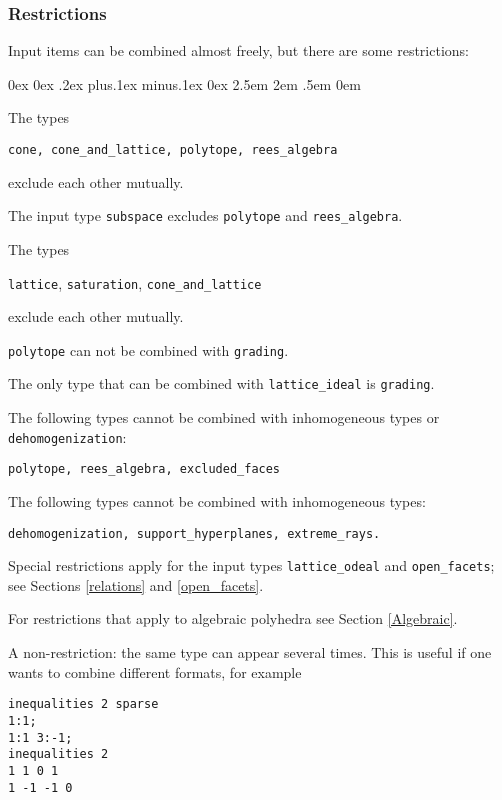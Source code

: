 \documentclass[12pt,a4paper]{scrartcl}
\newcounter{listi}
\newcommand{\stdli}{ \topsep0ex \partopsep0ex %
\parsep.2ex plus.1ex minus.1ex \itemsep0ex%
\leftmargin2.5em \labelwidth2em \labelsep.5em \rightmargin0em}%
\newenvironment{arab}{\begin{list}{\textup{(\arabic{listi})}}%
	{\usecounter{listi}\stdli}}{\end{list}}
\theoremstyle{definition}
\def\ttt{\texttt}
\begin{document}
\subsubsection{Restrictions}

Input items can be combined almost freely, but there are some restrictions:

\begin{arab}
	\item The types
	\begin{center}
		\ttt {cone, cone\_and\_lattice, polytope, rees\_algebra}	
	\end{center}
	exclude each other mutually.
	\item The input type \verb|subspace| excludes \verb|polytope| and \verb|rees_algebra|.
	\item The types
	\begin{center}
		\ttt {lattice}, \ttt{saturation}, \ttt{cone\_and\_lattice}	
	\end{center}
	exclude each other mutually.
	\item \verb|polytope| can not be combined with \verb|grading|.
	\item The only type that can be combined with \ttt{lattice\_ideal} is \ttt{grading}.
	\item The following types cannot be combined with inhomogeneous types or \verb|dehomogenization|:
	\begin{center}
		\ttt{polytope, rees\_algebra, excluded\_faces}
	\end{center}
	
	\item The following types cannot be combined with inhomogeneous types:
	\begin{center}
		\ttt{dehomogenization, support\_hyperplanes, extreme\_rays.}
	\end{center}
	
	\item Special restrictions apply for the input types \verb|lattice_odeal| and \verb|open_facets|; see Sections \ref{relations} and \ref{open_facets}.
	
	\item For restrictions that apply to algebraic polyhedra see Section \ref{Algebraic}.
\end{arab}

A non-restriction: the same type can appear several times. This is useful if one wants to combine different formats, for example
\begin{Verbatim}
inequalities 2 sparse
1:1;
1:1 3:-1;
inequalities 2
1 1 0 1
1 -1 -1 0
\end{Verbatim}
\end{document}
